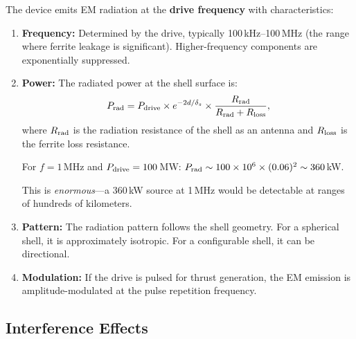 \documentclass[11pt]{article}
\begin{document}
\begin{tcolorbox}[colback=yellow!5,colframe=yellow!50!black,title=EM Emission Prediction]
The device emits EM radiation at the \textbf{drive frequency} with
characteristics:

\begin{enumerate}
\item \textbf{Frequency:} Determined by the drive, typically 100\,kHz--100\,MHz
  (the range where ferrite leakage is significant). Higher-frequency
  components are exponentially suppressed.

\item \textbf{Power:} The radiated power at the shell surface is:
  \begin{equation}
  P_{\rm rad} = P_{\rm drive} \times e^{-2d/\delta_s} \times \frac{R_{\rm rad}}{R_{\rm rad} + R_{\rm loss}},
  \end{equation}
  where $R_{\rm rad}$ is the radiation resistance of the shell as an
  antenna and $R_{\rm loss}$ is the ferrite loss resistance.

  For $f = 1$\,MHz and $P_{\rm drive} = 100$\,MW:
  $P_{\rm rad} \sim 100 \times 10^6 \times (0.06)^2 \sim 360$\,kW.

  This is \emph{enormous}---a 360\,kW source at 1\,MHz would be
  detectable at ranges of hundreds of kilometers.

\item \textbf{Pattern:} The radiation pattern follows the shell geometry.
  For a spherical shell, it is approximately isotropic. For a
  configurable shell, it can be directional.

\item \textbf{Modulation:} If the drive is pulsed for thrust generation,
  the EM emission is amplitude-modulated at the pulse repetition frequency.
\end{enumerate}
\end{tcolorbox}

\subsection{Interference Effects}
\end{document}
